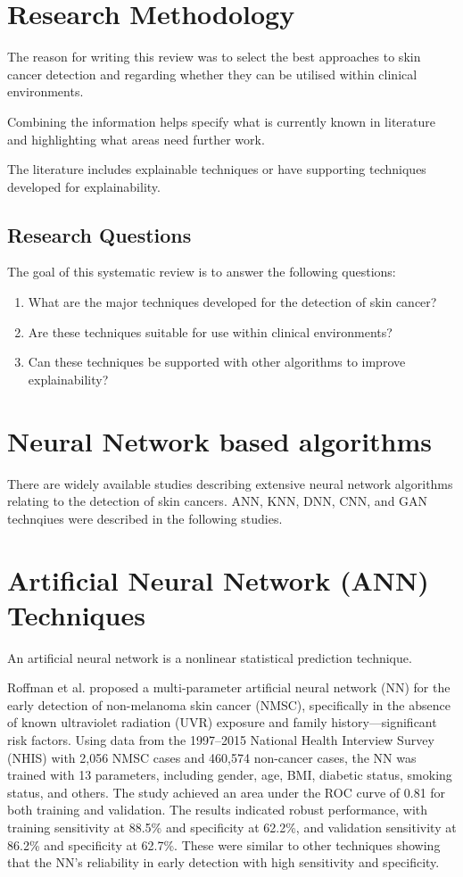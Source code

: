 \section{Research Methodology}
The reason for writing this review was to select the best approaches to skin cancer detection and regarding whether they can be utilised within clinical environments.

Combining the information helps specify what is currently known in literature and highlighting what areas need further work.

The literature includes explainable techniques or have supporting techniques developed for explainability.

\subsection{Research Questions}
The goal of this systematic review is to answer the following questions:

\begin{enumerate}
	\item What are the major techniques developed for the detection of skin cancer?
	\item Are these techniques suitable for use within clinical environments?
	\item Can these techniques be supported with other algorithms to improve explainability?
\end{enumerate}

\section{Neural Network based algorithms}
There are widely available studies describing extensive neural network algorithms relating to the detection of skin cancers. ANN, KNN, DNN, CNN, and GAN technqiues were described in the following studies\cite{Shah2023, Dildar2021}. 

\section{Artificial Neural Network (ANN) Techniques}
An artificial neural network is a nonlinear statistical prediction technique.

Roffman et al.\cite{Roffman2018} proposed a multi-parameter artificial neural network (NN) for the early detection of non-melanoma skin cancer (NMSC), specifically in the absence of known ultraviolet radiation (UVR) exposure and family history—significant risk factors. Using data from the 1997–2015 National Health Interview Survey (NHIS) with 2,056 NMSC cases and 460,574 non-cancer cases, the NN was trained with 13 parameters, including gender, age, BMI, diabetic status, smoking status, and others. The study achieved an area under the ROC curve of 0.81 for both training and validation. The results indicated robust performance, with training sensitivity at 88.5\% and specificity at 62.2\%, and validation sensitivity at 86.2\% and specificity at 62.7\%. These were similar to other techniques showing that the NN's reliability in early detection with high sensitivity and specificity.

